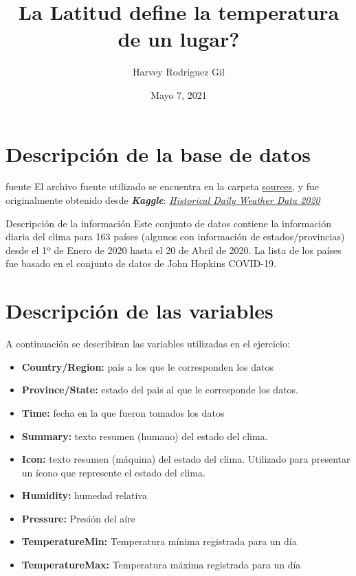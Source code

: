 \documentclass[
  ignorenonframetext,
]{beamer}
\title{La Latitud define la temperatura de un lugar?}
\author{Harvey Rodriguez Gil}
\date{Mayo 7, 2021}
\begin{document}
\frame{\titlepage}

\hypertarget{descripciuxf3n-de-la-base-de-datos}{%
\section{Descripción de la base de
datos}\label{descripciuxf3n-de-la-base-de-datos}}

\begin{frame}{fuente}
\protect\hypertarget{fuente}{}
El archivo fuente utilizado se encuentra en la carpeta
\href{sources/daily_weather_2020.csv}{sources}, y fue originalmente
obtenido desde \textbf{\emph{Kaggle}}:
\href{https://www.kaggle.com/vishalvjoseph/weather-dataset-for-covid19-predictions}{\emph{Historical
Daily Weather Data 2020}}
\end{frame}

\begin{frame}{Descripción de la información}
\protect\hypertarget{descripciuxf3n-de-la-informaciuxf3n}{}
Este conjunto de datos contiene la información diaria del clima para 163
países (algunos con información de estados/provincias) desde el 1º de
Enero de 2020 hasta el 20 de Abril de 2020. La lista de los países fue
basado en el conjunto de datos de John Hopkins COVID-19.
\end{frame}

\hypertarget{descripciuxf3n-de-las-variables}{%
\section{Descripción de las
variables}\label{descripciuxf3n-de-las-variables}}

\begin{frame}{A continuación se describiran las variables utilizadas en
el ejercicio:}
\protect\hypertarget{a-continuaciuxf3n-se-describiran-las-variables-utilizadas-en-el-ejercicio}{}
\begin{itemize}
\item
  \textbf{Country/Region:} país a los que le corresponden los datos
\item
  \textbf{Province/State:} estado del pais al que le corresponde los
  datos.
\item
  \textbf{Time:} fecha en la que fueron tomados los datos
\item
  \textbf{Summary:} texto resumen (humano) del estado del clima.
\item
  \textbf{Icon:} texto resumen (máquina) del estado del clima. Utilizado
  para presentar un ícono que represente el estado del clima.
\item
  \textbf{Humidity:} humedad relativa
\item
  \textbf{Pressure:} Presión del aíre
\item
  \textbf{TemperatureMin:} Temperatura mínima registrada para un día
\item
  \textbf{TemperatureMax:} Temperatura máxima registrada para un día
\end{itemize}
\end{frame}
\end{document}
